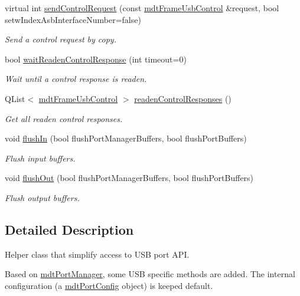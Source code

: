 \begin{DoxyCompactItemize}
virtual int \hyperlink{classmdt_usb_port_manager_aea4a67550effcba13acfc110d6d30c3e}{sendControlRequest} (const \hyperlink{classmdt_frame_usb_control}{mdtFrameUsbControl} \&request, bool setwIndexAsbInterfaceNumber=false)
\begin{DoxyCompactList}\small\item\em Send a control request by copy. \end{DoxyCompactList}\item 
bool \hyperlink{classmdt_usb_port_manager_ad91c432e85737f2224bbae651fb65a8d}{waitReadenControlResponse} (int timeout=0)
\begin{DoxyCompactList}\small\item\em Wait until a control response is readen. \end{DoxyCompactList}\item 
QList$<$ \hyperlink{classmdt_frame_usb_control}{mdtFrameUsbControl} $>$ \hyperlink{classmdt_usb_port_manager_a84c26fee7dfb26290659aa002e0842c6}{readenControlResponses} ()
\begin{DoxyCompactList}\small\item\em Get all readen control responses. \end{DoxyCompactList}\item 
void \hyperlink{classmdt_usb_port_manager_a982256ed17db155e1c95d544683a6dba}{flushIn} (bool flushPortManagerBuffers, bool flushPortBuffers)
\begin{DoxyCompactList}\small\item\em Flush input buffers. \end{DoxyCompactList}\item 
void \hyperlink{classmdt_usb_port_manager_ab723086376175c40635df44adf358985}{flushOut} (bool flushPortManagerBuffers, bool flushPortBuffers)
\begin{DoxyCompactList}\small\item\em Flush output buffers. \end{DoxyCompactList}\end{DoxyCompactItemize}


\subsection{Detailed Description}
Helper class that simplify access to USB port API. 

Based on \hyperlink{classmdt_port_manager}{mdtPortManager}, some USB specific methods are added. The internal configuration (a \hyperlink{classmdt_port_config}{mdtPortConfig} object) is keeped default. 

